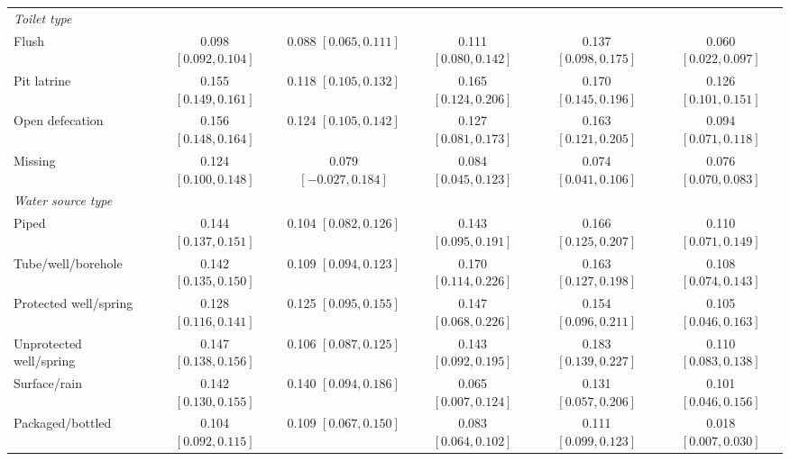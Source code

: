 \begin{landscape}
\begin{longtable}{lccccc}
\midrule
\multicolumn{6}{l}{\textit{Toilet type}} \\
Flush & 0.098 {\scriptsize$[0.092,0.104]$} & 0.088 {\scriptsize$[0.065,0.111]$} & 0.111 {\scriptsize$[0.080,0.142]$} & 0.137 {\scriptsize$[0.098,0.175]$} & 0.060 {\scriptsize$[0.022,0.097]$} \\
Pit latrine & 0.155 {\scriptsize$[0.149,0.161]$} & 0.118 {\scriptsize$[0.105,0.132]$} & 0.165 {\scriptsize$[0.124,0.206]$} & 0.170 {\scriptsize$[0.145,0.196]$} & 0.126 {\scriptsize$[0.101,0.151]$} \\
Open defecation & 0.156 {\scriptsize$[0.148,0.164]$} & 0.124 {\scriptsize$[0.105,0.142]$} & 0.127 {\scriptsize$[0.081,0.173]$} & 0.163 {\scriptsize$[0.121,0.205]$} & 0.094 {\scriptsize$[0.071,0.118]$} \\
Missing & 0.124 {\scriptsize$[0.100,0.148]$} & 0.079 {\scriptsize$[-0.027,0.184]$} & 0.084 {\scriptsize$[0.045,0.123]$} & 0.074 {\scriptsize$[0.041,0.106]$} & 0.076 {\scriptsize$[0.070,0.083]$} \\
\midrule
\multicolumn{6}{l}{\textit{Water source type}} \\
Piped & 0.144 {\scriptsize$[0.137,0.151]$} & 0.104 {\scriptsize$[0.082,0.126]$} & 0.143 {\scriptsize$[0.095,0.191]$} & 0.166 {\scriptsize$[0.125,0.207]$} & 0.110 {\scriptsize$[0.071,0.149]$} \\
Tube/well/borehole & 0.142 {\scriptsize$[0.135,0.150]$} & 0.109 {\scriptsize$[0.094,0.123]$} & 0.170 {\scriptsize$[0.114,0.226]$} & 0.163 {\scriptsize$[0.127,0.198]$} & 0.108 {\scriptsize$[0.074,0.143]$} \\
Protected well/spring & 0.128 {\scriptsize$[0.116,0.141]$} & 0.125 {\scriptsize$[0.095,0.155]$} & 0.147 {\scriptsize$[0.068,0.226]$} & 0.154 {\scriptsize$[0.096,0.211]$} & 0.105 {\scriptsize$[0.046,0.163]$} \\
Unprotected well/spring & 0.147 {\scriptsize$[0.138,0.156]$} & 0.106 {\scriptsize$[0.087,0.125]$} & 0.143 {\scriptsize$[0.092,0.195]$} & 0.183 {\scriptsize$[0.139,0.227]$} & 0.110 {\scriptsize$[0.083,0.138]$} \\
Surface/rain & 0.142 {\scriptsize$[0.130,0.155]$} & 0.140 {\scriptsize$[0.094,0.186]$} & 0.065 {\scriptsize$[0.007,0.124]$} & 0.131 {\scriptsize$[0.057,0.206]$} & 0.101 {\scriptsize$[0.046,0.156]$} \\
Packaged/bottled & 0.104 {\scriptsize$[0.092,0.115]$} & 0.109 {\scriptsize$[0.067,0.150]$} & 0.083 {\scriptsize$[0.064,0.102]$} & 0.111 {\scriptsize$[0.099,0.123]$} & 0.018 {\scriptsize$[0.007,0.030]$} \\

\end{longtable}
\end{landscape}
